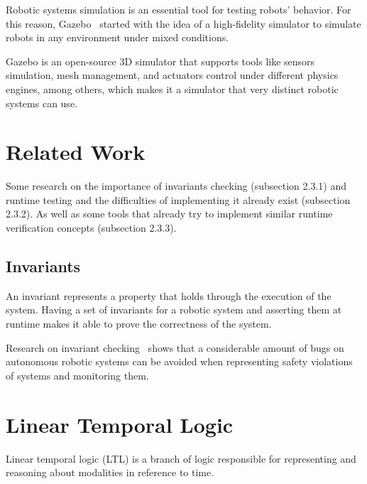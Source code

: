 Robotic systems simulation is an essential tool for testing robots' behavior. For this reason, Gazebo~\cite{koenig2004design} started with the idea of a high-fidelity simulator to simulate robots in any environment under mixed conditions.

Gazebo is an open-source 3D simulator that supports tools like sensors simulation, mesh management, and actuators control under different physics engines, among others, which makes it a simulator that very distinct robotic systems can use.

\section{Related Work}
\label{sec:robottesting}

Some research on the importance of invariants checking (subsection 2.3.1) and runtime testing and the difficulties of implementing it already exist (subsection 2.3.2). As well as some tools that already try to implement similar runtime verification concepts (subsection 2.3.3).


\subsection{Invariants}

An invariant represents a property that holds through the execution of the system. Having a set of invariants for a robotic system and asserting them at runtime makes it able to prove the correctness of the system.

Research on invariant checking~\cite{zizyte2021importance} shows that a considerable amount of bugs on autonomous robotic systems can be avoided when representing safety violations of systems and monitoring them.


\section{Linear Temporal Logic}
\label{sec:ltl}

Linear temporal logic (LTL) is a branch of logic responsible for representing and reasoning about modalities in reference to time. 

